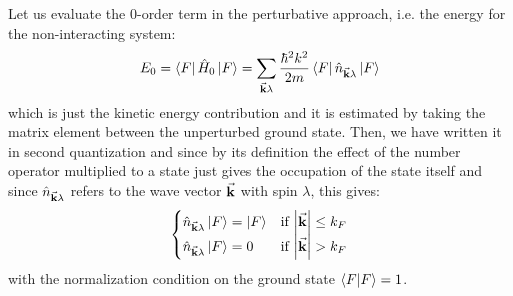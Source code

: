 \documentclass[../main/main.tex]{subfiles}
\begin{document}
Let us evaluate the 0-order term in the perturbative approach, i.e. the energy for the non-interacting system:
\begin{equation*}
  E_0 = \bra{F} \hat{H}_0 \ket{F} = \sum_{\va{k} \lambda }^{} \frac{\hbar ^2 k^2}{2m }     \bra{F} \hat{n}_{\va{k}\lambda } \ket{F}
\end{equation*}
which is just the kinetic energy contribution and it is estimated by taking the matrix element between the unperturbed ground state.
Then, we have written it in second quantization and since by its definition the effect of the number operator multiplied to a state just gives the occupation of the state itself and  since  \( \hat{n}_{\va{k} \lambda }  \) refers to the wave vector \( \va{k} \) with spin \( \lambda  \), this gives:
\begin{equation*}
  \begin{cases}
   \hat{n}_{\va{k} \lambda } \ket{F} = \ket{F} & \text{if } \abs{\va{k}} \le k_F  \\
  \hat{n}_{\va{k} \lambda } \ket{F} = 0  & \text{if } \abs{\va{k}} > k_F
  \end{cases}
\end{equation*}
with the normalization condition on the ground state \(  \braket{F}{F}=1   \).
\end{document}
